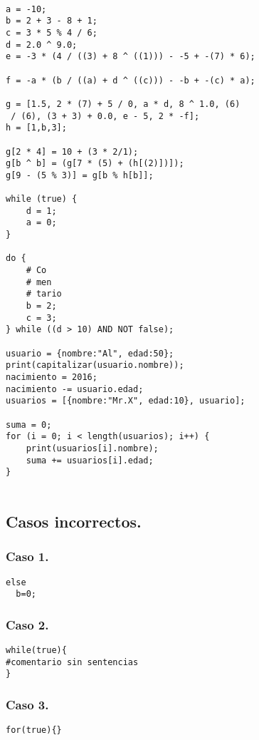 \begin{verbatim}

a = -10;
b = 2 + 3 - 8 + 1;
c = 3 * 5 % 4 / 6;
d = 2.0 ^ 9.0;
e = -3 * (4 / ((3) + 8 ^ ((1))) - -5 + -(7) * 6);

f = -a * (b / ((a) + d ^ ((c))) - -b + -(c) * a);

g = [1.5, 2 * (7) + 5 / 0, a * d, 8 ^ 1.0, (6)
 / (6), (3 + 3) + 0.0, e - 5, 2 * -f];
h = [1,b,3];

g[2 * 4] = 10 + (3 * 2/1);
g[b ^ b] = (g[7 * (5) + (h[(2)])]);
g[9 - (5 % 3)] = g[b % h[b]];

while (true) {
	d = 1;
	a = 0;
}

do {
	# Co
	# men
	# tario
	b = 2;
	c = 3;
} while ((d > 10) AND NOT false);

usuario = {nombre:"Al", edad:50};
print(capitalizar(usuario.nombre));
nacimiento = 2016;
nacimiento -= usuario.edad;
usuarios = [{nombre:"Mr.X", edad:10}, usuario];

suma = 0;
for (i = 0; i < length(usuarios); i++) {
	print(usuarios[i].nombre);
	suma += usuarios[i].edad;
}


\end{verbatim}


\subsection{Casos incorrectos.}
\subsubsection{Caso 1.}

\begin{verbatim}
else
  b=0;

\end{verbatim}

\subsubsection{Caso 2.}

\begin{verbatim}
while(true){
#comentario sin sentencias
}

\end{verbatim}

\subsubsection{Caso 3.}

\begin{verbatim}
for(true){}
\end{verbatim}

